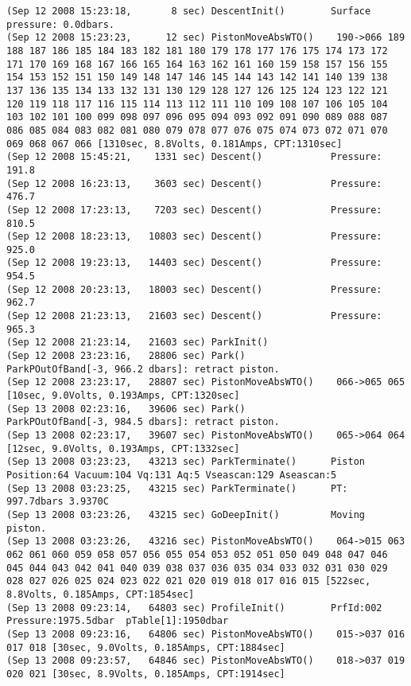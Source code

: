 {\begin{verbatim}
(Sep 12 2008 15:23:18,       8 sec) DescentInit()        Surface pressure: 0.0dbars.
(Sep 12 2008 15:23:23,      12 sec) PistonMoveAbsWTO()    190->066 189 188 187 186 185 184 183 182 181 180 179 178 177 176 175 174 173 172 171 170 169 168 167 166 165 164 163 162 161 160 159 158 157 156 155 154 153 152 151 150 149 148 147 146 145 144 143 142 141 140 139 138 137 136 135 134 133 132 131 130 129 128 127 126 125 124 123 122 121 120 119 118 117 116 115 114 113 112 111 110 109 108 107 106 105 104 103 102 101 100 099 098 097 096 095 094 093 092 091 090 089 088 087 086 085 084 083 082 081 080 079 078 077 076 075 074 073 072 071 070 069 068 067 066 [1310sec, 8.8Volts, 0.181Amps, CPT:1310sec]
(Sep 12 2008 15:45:21,    1331 sec) Descent()            Pressure: 191.8
(Sep 12 2008 16:23:13,    3603 sec) Descent()            Pressure: 476.7
(Sep 12 2008 17:23:13,    7203 sec) Descent()            Pressure: 810.5
(Sep 12 2008 18:23:13,   10803 sec) Descent()            Pressure: 925.0
(Sep 12 2008 19:23:13,   14403 sec) Descent()            Pressure: 954.5
(Sep 12 2008 20:23:13,   18003 sec) Descent()            Pressure: 962.7
(Sep 12 2008 21:23:13,   21603 sec) Descent()            Pressure: 965.3
(Sep 12 2008 21:23:14,   21603 sec) ParkInit()           
(Sep 12 2008 23:23:16,   28806 sec) Park()               ParkPOutOfBand[-3, 966.2 dbars]: retract piston.
(Sep 12 2008 23:23:17,   28807 sec) PistonMoveAbsWTO()    066->065 065 [10sec, 9.0Volts, 0.193Amps, CPT:1320sec]
(Sep 13 2008 02:23:16,   39606 sec) Park()               ParkPOutOfBand[-3, 984.5 dbars]: retract piston.
(Sep 13 2008 02:23:17,   39607 sec) PistonMoveAbsWTO()    065->064 064 [12sec, 9.0Volts, 0.193Amps, CPT:1332sec]
(Sep 13 2008 03:23:23,   43213 sec) ParkTerminate()      Piston Position:64 Vacuum:104 Vq:131 Aq:5 Vseascan:129 Aseascan:5
(Sep 13 2008 03:23:25,   43215 sec) ParkTerminate()      PT: 997.7dbars 3.9370C
(Sep 13 2008 03:23:26,   43215 sec) GoDeepInit()         Moving piston.
(Sep 13 2008 03:23:26,   43216 sec) PistonMoveAbsWTO()    064->015 063 062 061 060 059 058 057 056 055 054 053 052 051 050 049 048 047 046 045 044 043 042 041 040 039 038 037 036 035 034 033 032 031 030 029 028 027 026 025 024 023 022 021 020 019 018 017 016 015 [522sec, 8.8Volts, 0.185Amps, CPT:1854sec]
(Sep 13 2008 09:23:14,   64803 sec) ProfileInit()        PrfId:002  Pressure:1975.5dbar  pTable[1]:1950dbar
(Sep 13 2008 09:23:16,   64806 sec) PistonMoveAbsWTO()    015->037 016 017 018 [30sec, 9.0Volts, 0.185Amps, CPT:1884sec]
(Sep 13 2008 09:23:57,   64846 sec) PistonMoveAbsWTO()    018->037 019 020 021 [30sec, 8.9Volts, 0.185Amps, CPT:1914sec]

\end{verbatim}}
